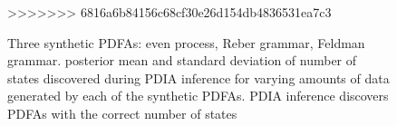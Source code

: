 \begin{figure}[htbp]
\label{fig:synthetic_grammar_and_synth_results}
\caption{Three synthetic PDFAs:  even process,  Reber grammar,  Feldman grammar.   posterior mean and standard deviation of number of states discovered during PDIA inference for varying amounts of data generated by each of the synthetic PDFAs.  PDIA inference discovers PDFAs with the correct number of states}
>>>>>>> 6816a6b84156c68cf30e26d154db4836531ea7c3
\end{figure}